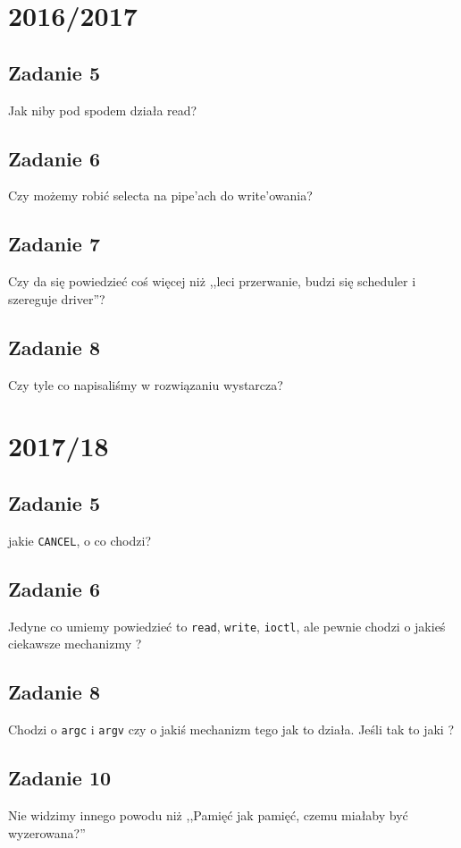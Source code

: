 \section{2016/2017}
    \subsection{Zadanie 5}
    Jak niby pod spodem działa read?

    \subsection{Zadanie 6}
    Czy możemy robić selecta na pipe'ach do write'owania?

    \subsection{Zadanie 7}
    Czy da się powiedzieć coś więcej niż ,,leci przerwanie, budzi się scheduler i szereguje driver''?
    
    \subsection{Zadanie 8}
    Czy tyle co napisaliśmy w rozwiązaniu wystarcza? 

\section{2017/18}
    \subsection{Zadanie 5}
    jakie \texttt{CANCEL}, o co chodzi?
    
    \subsection{Zadanie 6}
    Jedyne co umiemy powiedzieć to \texttt{read}, \texttt{write}, \texttt{ioctl}, ale pewnie chodzi o jakieś ciekawsze mechanizmy ?
    
    \subsection{Zadanie 8}
    Chodzi o \texttt{argc} i \texttt{argv} czy o jakiś mechanizm tego jak to działa. Jeśli tak to jaki ?
    
    \subsection{Zadanie 10}
    Nie widzimy innego powodu niż ,,Pamięć jak pamięć, czemu miałaby być wyzerowana?''
    
